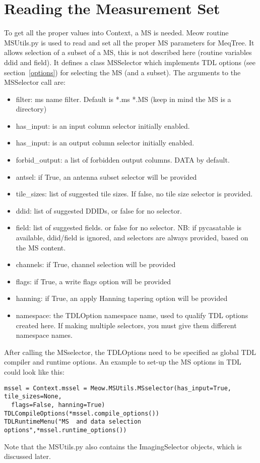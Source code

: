 \documentclass[11pt]{article}
\begin{document}
\section{Reading the Measurement Set}\label{ms}
To get all the proper values into Context, a MS is needed. Meow routine MSUtils.py is used to read and set all the proper MS parameters for MeqTree. It allows selection of a subset of a MS, this is not described here (routine variables ddid and field). It defines a class MSSelector which implements TDL options (see section~\ref{options}) for selecting  the MS (and a subset). The arguments to the MSSelector call are:
\begin{itemize}
\item     filter:     ms name filter. Default is *.ms *.MS (keep in mind the MS is a directory)
\item    has\_input:  is an input column selector initially enabled.
\item    has\_input:  is an output column selector initially enabled.
\item    forbid\_output: a list of forbidden output columns. DATA by default.
\item    antsel:     if True, an antenna subset selector will be provided
\item    tile\_sizes: list of suggested tile sizes. If false, no tile size selector is provided.
\item    ddid:       list of suggested DDIDs, or false for no selector.
\item    field:      list of suggested fields. or false for no selector.
      NB: if pycasatable is available, ddid/field is ignored, and selectors are always
      provided, based on the MS content.
\item    channels:   if True, channel selection will be provided
\item    flags:      if True, a write flags option will be provided
\item    hanning:    if True, an apply Hanning tapering option will be provided
\item    namespace:  the TDLOption namespace name, used to qualify TDL options created here.         If making multiple selectors, you must give them different namespace names.
\end{itemize}

After calling the MSselector, the TDLOptions need to be specified as global TDL compiler and runtime options. An example to set-up the MS options in TDL could look like this:
\begin{verbatim}
mssel = Context.mssel = Meow.MSUtils.MSselector(has_input=True, tile_sizes=None, 
  flags=False, hanning=True)
TDLCompileOptions(*mssel.compile_options())
TDLRuntimeMenu("MS  and data selection options",*mssel.runtime_options())
\end{verbatim}

Note that the MSUtils.py also contains the ImagingSelector objects, which is discussed later.



\end{document}
